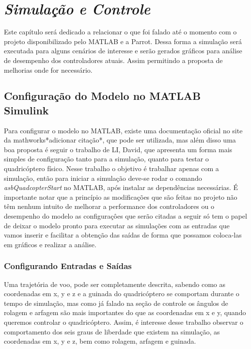 \chapter{\textit{Simulação e Controle}}

Este capítulo será dedicado a relacionar o que foi falado até o momento com o projeto disponibilizado pelo MATLAB e a Parrot. Dessa forma a simulação será executada para alguns cenários de interesse e serão gerados gráficos para análise de desempenho dos controladores atuais. Assim permitindo a proposta de melhorias onde for necessário.

\section{Configuração do Modelo no MATLAB Simulink}

Para configurar o modelo no MATLAB, existe uma documentação oficial no site da mathworks*adicionar citação*, que pode ser utilizada, mas além disso uma boa proposta é seguir o trabalho de LI, David, que apresenta um forma mais simples de configuração tanto para a simulação, quanto para testar o quadricóptero físico. Nesse trabalho o objetivo é trabalhar apenas com a simulação, então para iniciar a simulação deve-se rodar o comando \textit{asbQuadcopterStart} no MATLAB, após instalar as dependências necessárias. É importante notar que a princípio as modificações que são feitas no projeto não têm nenhum intuito de melhorar a performance dos controladores ou o desempenho do modelo as configuraçôes que serão citadas a seguir só tem o papel de deixar o modelo pronto para executar as simulações com as entradas que vamos inserir e facilitar a obtenção das saídas de forma que possamos coloca-las em gráficos e realizar a análise.

\subsection{Configurando Entradas e Saídas}

Uma trajetória de voo, pode ser completamente descrita, sabendo como as coordenadas em x, y e z e a guinada do quadricóptero se comportam durante o tempo de simulação, mas como já falado na seção de controle os ângulos de rolagem e arfagem são mais importantes do que as coordenadas em x e y, quando queremos controlar o quadricóptero. Assim, é interesse desse trabalho observar o comportamento dos seis graus de liberdade que existem na simulação, as coordenadas em x, y e z, bem como rolagem, arfagem e guinada. 

